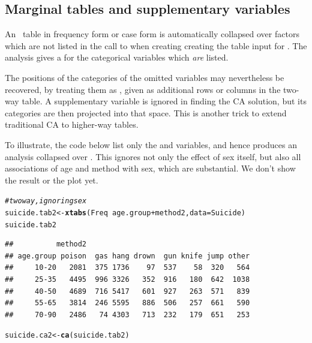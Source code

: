 \documentclass[11pt]{book}\usepackage[]{graphicx}\usepackage[]{color}
\makeatletter
\newcommand{\hlcom}[1]{\textcolor[rgb]{0.678,0.584,0.686}{\textit{#1}}}%
\newcommand{\hlopt}[1]{\textcolor[rgb]{0,0,0}{#1}}%
\newcommand{\hlstd}[1]{\textcolor[rgb]{0.345,0.345,0.345}{#1}}%
\newcommand{\hlkwb}[1]{\textcolor[rgb]{0.69,0.353,0.396}{#1}}%
\newcommand{\hlkwc}[1]{\textcolor[rgb]{0.333,0.667,0.333}{#1}}%
\newcommand{\hlkwd}[1]{\textcolor[rgb]{0.737,0.353,0.396}{\textbf{#1}}}%
\newenvironment{kframe}{%
 \def\at@end@of@kframe{}%
 \ifinner\ifhmode%
  \def\at@end@of@kframe{\end{minipage}}%
  \begin{minipage}{\columnwidth}%
 \fi\fi%
 \def\FrameCommand##1{\hskip\@totalleftmargin \hskip-\fboxsep
 \colorbox{shadecolor}{##1}\hskip-\fboxsep
     \hskip-\linewidth \hskip-\@totalleftmargin \hskip\columnwidth}%
 \MakeFramed {\advance\hsize-\width
   \@totalleftmargin\z@ \linewidth\hsize
   \@setminipage}}%
 {\par\unskip\endMakeFramed%
 \at@end@of@kframe}
\newenvironment{knitrout}{}{} %
\renewenvironment{knitrout}{\small\renewcommand{\baselinestretch}{.85}}{} %
\makeatother
\begin{document}

\subsection{Marginal tables and supplementary variables}\label{ca:marginal}

An \nway\ table in frequency form or case form is automatically collapsed
over factors which are not listed in the 
call to  when creating creating the table input for .
The analysis gives a  for the categorical variables which
\emph{are} listed.  

The positions of the categories of the omitted variables
may nevertheless be recovered, by treating them as ,
given as additional rows or columns in the two-way table.
A supplementary variable is ignored in finding the CA solution,
but its categories are then projected into that space.  
This is another trick to extend traditional CA to higher-way tables.

To illustrate, the code below list only the 
and  variables, and hence produces an analysis
collapsed over .
This ignores not only the effect of sex itself,
but also all associations of age and method with sex,
which are substantial. We don't show the  result
or the plot yet.

\begin{knitrout}
\color{fgcolor}\begin{kframe}
\begin{alltt}
\hlcom{# two way, ignoring sex}
\hlstd{suicide.tab2} \hlkwb{<-} \hlkwd{xtabs}\hlstd{(Freq} \hlopt{~} \hlstd{age.group} \hlopt{+} \hlstd{method2,} \hlkwc{data}\hlstd{=Suicide)}
\hlstd{suicide.tab2}
\end{alltt}
\begin{verbatim}
##          method2
## age.group poison  gas hang drown  gun knife jump other
##     10-20   2081  375 1736    97  537    58  320   564
##     25-35   4495  996 3326   352  916   180  642  1038
##     40-50   4689  716 5417   601  927   263  571   839
##     55-65   3814  246 5595   886  506   257  661   590
##     70-90   2486   74 4303   713  232   179  651   253
\end{verbatim}
\begin{alltt}
\hlstd{suicide.ca2} \hlkwb{<-} \hlkwd{ca}\hlstd{(suicide.tab2)}
\end{alltt}
\end{kframe}
\end{knitrout}
\end{document}
